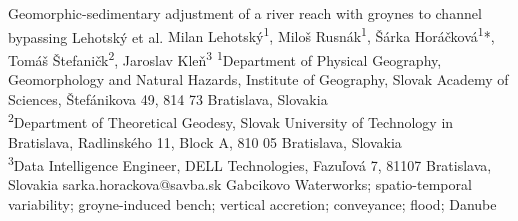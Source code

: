 \abstract
{Geomorphic-sedimentary adjustment of a river reach with groynes to channel bypassing} %
{Lehotský et al.} %
{Milan Lehotský\textsuperscript{1}, Miloš Rusnák\textsuperscript{1}, Šárka Horáčková\textsuperscript{1}*, 
Tomáš Štefaničk\textsuperscript{2}, Jaroslav Kleň\textsuperscript{3}} %
{\TLtag} %
{\textsuperscript{1}Department of Physical Geography, Geomorphology and Natural Hazards, Institute of Geography, Slovak Academy of Sciences, Štefánikova 49, 814 73 Bratislava, Slovakia\\
\textsuperscript{2}Department of Theoretical Geodesy, Slovak University of Technology in Bratislava, Radlinského 11, Block A, 810 05 Bratislava, Slovakia\\
\textsuperscript{3}Data Intelligence Engineer, DELL Technologies, Fazuľová 7, 81107 Bratislava, Slovakia 
} %
{sarka.horackova@savba.sk}  %
{Gabcikovo Waterworks; spatio-temporal variability; groyne-induced bench; vertical accretion; conveyance; flood; Danube }%
